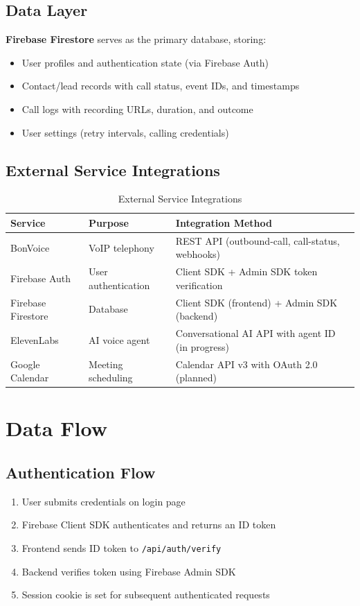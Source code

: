 \documentclass[12pt,a4paper,oneside]{book}
\begin{document}
\subsection{Data Layer}

\textbf{Firebase Firestore} serves as the primary database, storing:
\begin{itemize}
    \item User profiles and authentication state (via Firebase Auth)
    \item Contact/lead records with call status, event IDs, and timestamps
    \item Call logs with recording URLs, duration, and outcome
    \item User settings (retry intervals, calling credentials)
\end{itemize}

\subsection{External Service Integrations}

\begin{table}[H]
\centering
\caption{External Service Integrations}
\label{tab:integrations}
\begin{tabularx}{\textwidth}{|l|l|X|}
\hline
\textbf{Service} & \textbf{Purpose} & \textbf{Integration Method} \\
\hline
BonVoice & VoIP telephony & REST API (outbound-call, call-status, webhooks) \\
\hline
Firebase Auth & User authentication & Client SDK + Admin SDK token verification \\
\hline
Firebase Firestore & Database & Client SDK (frontend) + Admin SDK (backend) \\
\hline
ElevenLabs & AI voice agent & Conversational AI API with agent ID (in progress) \\
\hline
Google Calendar & Meeting scheduling & Calendar API v3 with OAuth 2.0 (planned) \\
\hline
\end{tabularx}
\end{table}

\section{Data Flow}

\subsection{Authentication Flow}
\begin{enumerate}
    \item User submits credentials on login page
    \item Firebase Client SDK authenticates and returns an ID token
    \item Frontend sends ID token to \texttt{/api/auth/verify}
    \item Backend verifies token using Firebase Admin SDK
    \item Session cookie is set for subsequent authenticated requests
\end{enumerate}
\end{document}

